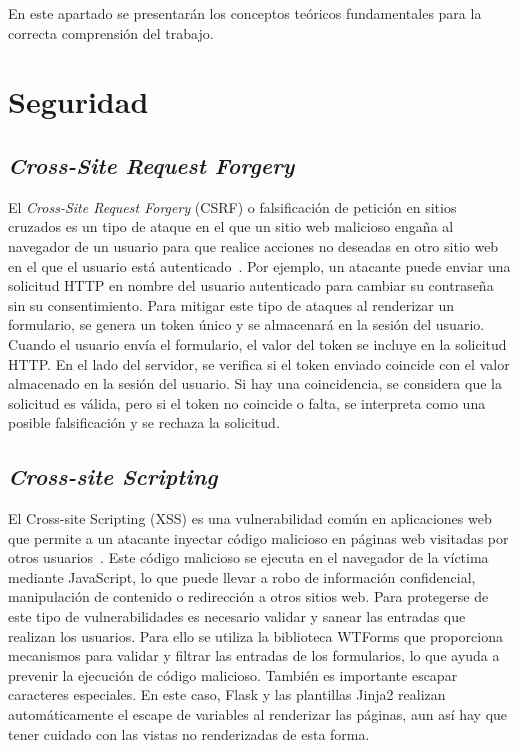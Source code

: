 
En este apartado se presentarán los conceptos teóricos fundamentales para la correcta comprensión del trabajo.

\section{Seguridad}
\subsection{\textit{Cross-Site Request Forgery}}
El \textit{Cross-Site Request Forgery} (CSRF) o  falsificación de petición en sitios cruzados es un tipo de ataque en el que un sitio web malicioso engaña al navegador de un usuario para que realice acciones no deseadas en otro sitio web en el que el usuario está autenticado~\cite{wiki:csrf}.
Por ejemplo, un atacante puede enviar una solicitud HTTP en nombre del usuario autenticado para cambiar su contraseña sin su consentimiento.
Para mitigar este tipo de ataques al renderizar un formulario, se genera un token único y se almacenará en la sesión del usuario.
Cuando el usuario envía el formulario, el valor del token se incluye en la solicitud HTTP. 
En el lado del servidor, se verifica si el token enviado coincide con el valor almacenado en la sesión del usuario. 
Si hay una coincidencia, se considera que la solicitud es válida, pero si el token no coincide o falta, se interpreta como una posible falsificación y se rechaza la solicitud.

\subsection{\textit{Cross-site Scripting}}
El Cross-site Scripting (XSS) es una vulnerabilidad común en aplicaciones web que permite a un atacante inyectar código malicioso en páginas web visitadas por otros usuarios~\cite{wiki:xss}.
Este código malicioso se ejecuta en el navegador de la víctima mediante JavaScript, lo que puede llevar a robo de información confidencial, manipulación de contenido o redirección a otros sitios web.
Para protegerse de este tipo de vulnerabilidades es necesario validar y sanear las entradas que realizan los usuarios. 
Para ello se utiliza la biblioteca WTForms que proporciona mecanismos para validar y filtrar las entradas de los formularios, lo que ayuda a prevenir la ejecución de código malicioso.
También es importante escapar caracteres especiales.
En este caso, Flask y las plantillas Jinja2 realizan automáticamente el escape de variables al renderizar las páginas, aun así hay que tener cuidado con las vistas no renderizadas de esta forma.

